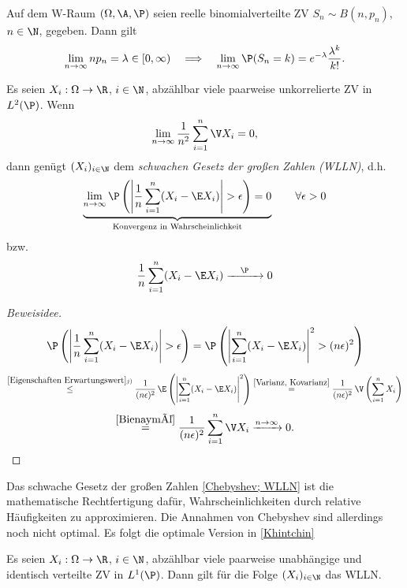 \documentclass[11pt, a4paper]{article}
\begin{document}
\begin{theorem} \Theorem
    Auf dem W-Raum $(\Omega, \A, \P)$ seien reelle binomialverteilte ZV $S_n \sim B(n, p_n)$, $n \in \N$, gegeben. Dann gilt
    $$\lim_{n \to \infty} n p_n = \lambda \in [0, \infty) \quad \Longrightarrow \quad \lim_{n \to \infty} \P(S_n = k) = e^{-\lambda} \frac{\lambda^k}{k!}.$$
\end{theorem}

\begin{theorem} \Theorem
    Es seien $X_i: \Omega \to \R$, $i \in \N$, abzählbar viele paarweise unkorrelierte ZV in $L^2(\P)$. Wenn
    $$\lim_{n \to \infty} \frac{1}{n^2} \sum_{i=1}^n \V X_i = 0,$$
    dann genügt $(X_i)_{i \in \N}$ dem \emph{schwachen Gesetz der großen Zahlen (WLLN)}, d.h.
    $$\underbrace{\lim_{n \to \infty} \P\left(\left| \frac{1}{n} \sum_{i=1}^n (X_i - \E X_i) \right| > \epsilon\right) = 0}_{\text{Konvergenz in Wahrscheinlichkeit}} \qquad \forall \epsilon > 0$$
    bzw.
    $$ \frac{1}{n} \sum_{i=1}^n (X_i - \E X_i) \xrightarrow{\quad \P\quad } 0$$
\end{theorem}

\begin{proof}[Beweisidee]
    $$\P\left(\left| \frac{1}{n} \sum_{i=1}^n (X_i - \E X_i) \right| > \epsilon\right)
    = \P\left(\left|\sum_{i=1}^n (X_i - \E X_i)\right|^2 > (n\epsilon)^2\right) $$$$\overset{\ref{Eigenschaften Erwartungswert} j)}{\le} \frac{1}{(n\epsilon)^2} \, \E\left(\left|\sum_{i=1}^n (X_i - \E X_i)\right|^2\right)\overset{\ref{Varianz, Kovarianz}}{=} \frac{1}{(n\epsilon)^2} \, \V\left(\sum_{i=1}^n X_i\right) $$$$\overset{\ref{Bienaymé}}{=} \frac{1}{(n\epsilon)^2} \sum_{i=1}^n \V X_i \xrightarrow{n \to \infty} 0.$$
\end{proof}

\begin{note}
    Das schwache Gesetz der großen Zahlen \ref{Chebyshev; WLLN} ist die mathematische Rechtfertigung dafür, Wahrscheinlichkeiten durch relative Häufigkeiten zu approximieren. Die Annahmen von Chebyshev sind allerdings noch nicht optimal. Es folgt die optimale Version in \ref{Khintchin}
\end{note}

\begin{theorem}[Khintchin] \Theorem
    Es seien $X_i: \Omega \to \R$, $i \in \N$, abzählbar viele paarweise unabhängige und identisch verteilte ZV in $L^1(\P)$. Dann gilt für die Folge $(X_i)_{i \in \N}$ das WLLN.
\end{theorem}
\end{document}
